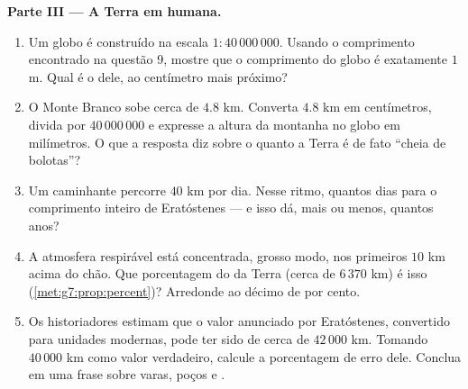 \begin{problem}
\medskip
\noindent\textbf{Parte III --- A Terra em  humana.}
\begin{enumerate}[resume]
  \item Um globo é construído na escala $1 : 40\,000\,000$. Usando o
        comprimento encontrado na questão 9, mostre que o comprimento
        do globo é exatamente $1$ m. Qual é o  dele, ao
        centímetro mais próximo?
  \item O Monte Branco sobe cerca de $4.8$ km. Converta $4.8$ km em
        centímetros, divida por $40\,000\,000$ e expresse a altura da
        montanha no globo em milímetros. O que a resposta diz sobre o
        quanto a Terra é de fato ``cheia de bolotas''?
  \item Um caminhante percorre $40$ km por dia. Nesse ritmo, quantos
        dias para o comprimento inteiro de Eratóstenes --- e isso dá,
        mais ou menos, quantos anos?
  \item A atmosfera respirável está concentrada, grosso modo, nos
        primeiros $10$ km acima do chão. Que porcentagem do  da
        Terra (cerca de $6\,370$ km) é isso
        (\cref{met:g7:prop:percent})? Arredonde ao décimo de por
        cento.
  \item Os historiadores estimam que o valor anunciado por Eratóstenes,
        convertido para unidades modernas, pode ter sido de cerca de
        $42\,000$ km. Tomando $40\,000$ km como valor verdadeiro,
        calcule a porcentagem de erro dele. Conclua em uma frase sobre
        varas, poços e .
\end{enumerate}
\end{problem}
